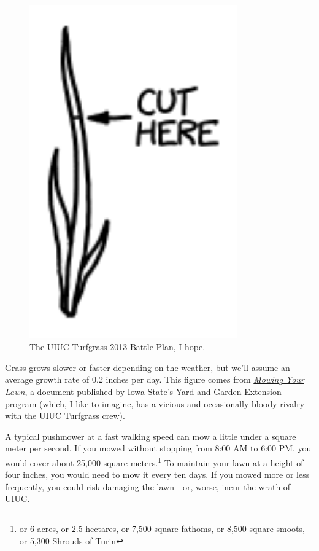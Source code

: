 {\begin{figure}[!htbp]
\centering
\includegraphics[scale=0.5, max width=0.8\textwidth]{imgs/a/70/lawn_cuthere.png}
\caption{The UIUC Turfgrass 2013 Battle Plan, I hope.}
\end{figure}

{Grass grows slower or faster depending on the weather, but we'll assume an average growth rate of 0.2 inches per day. This figure comes from \emph{ \href{http://www.extension.iastate.edu/publications/pm1213.pdf}{Mowing Your Lawn}}, a document published by Iowa State's \href{http://www.yardandgarden.extension.iastate.edu/}{Yard and Garden Extension} program (which, I like to imagine, has a vicious and occasionally bloody rivalry with the UIUC Turfgrass crew).}

{A typical pushmower at a fast walking speed can mow a little under a square meter per second. If you mowed without stopping from 8:00 AM to 6:00 PM, you would cover about 25,000 square meters.{\footnote{or 6 acres, or 2.5 hectares, or 7,500 square fathoms, or 8,500 square smoots, or 5,300 Shrouds of Turin} } To maintain your lawn at a height of four inches, you would need to mow it every ten days. If you mowed more or less frequently, you could risk damaging the lawn—or, worse, incur the wrath of UIUC.}

}
